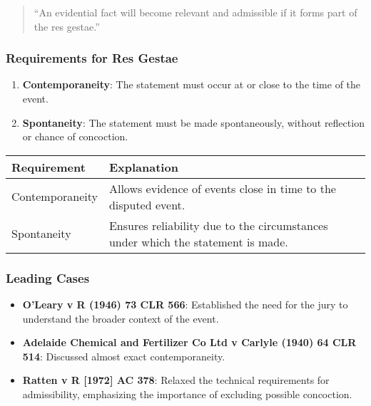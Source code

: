 \begin{quote}
``An evidential fact will become relevant and admissible if it forms
part of the res gestae.''
\end{quote}

\subsubsection{Requirements for Res
Gestae}\label{requirements-for-res-gestae}

\begin{enumerate}
\def\labelenumi{\arabic{enumi}.}
\tightlist
\item
  \textbf{Contemporaneity}: The statement must occur at or close to the
  time of the event.
\item
  \textbf{Spontaneity}: The statement must be made spontaneously,
  without reflection or chance of concoction.
\end{enumerate}

\begin{longtable}[]{@{}
  >{\raggedright\arraybackslash}p{}
  >{\raggedright\arraybackslash}p{}@{}}
\toprule\noalign{}
\begin{minipage}[b]{\linewidth}\raggedright
Requirement
\end{minipage} & \begin{minipage}[b]{\linewidth}\raggedright
Explanation
\end{minipage} \\
\midrule\noalign{}
\endhead
\bottomrule\noalign{}
\endlastfoot
Contemporaneity & Allows evidence of events close in time to the
disputed event. \\
Spontaneity & Ensures reliability due to the circumstances under which
the statement is made. \\
\end{longtable}

\subsubsection{Leading Cases}\label{leading-cases}

\begin{itemize}
\tightlist
\item
  \textbf{O'Leary v R (1946) 73 CLR 566}: Established the need for the
  jury to understand the broader context of the event.
\item
  \textbf{Adelaide Chemical and Fertilizer Co Ltd v Carlyle (1940) 64
  CLR 514}: Discussed almost exact contemporaneity.
\item
  \textbf{Ratten v R {[}1972{]} AC 378}: Relaxed the technical
  requirements for admissibility, emphasizing the importance of
  excluding possible concoction.
\end{itemize}

